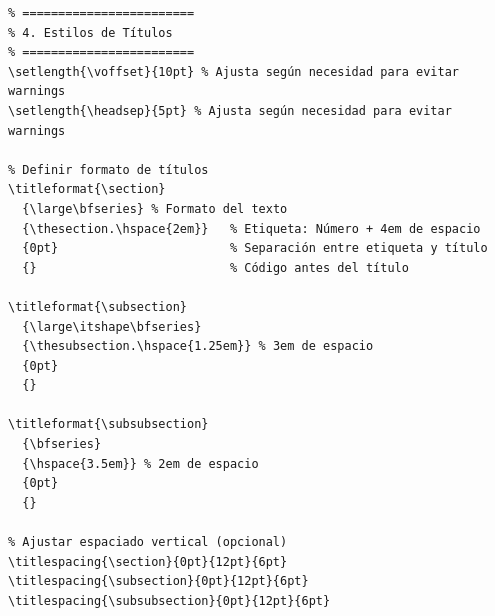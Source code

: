 \documentclass[english]{reporti}
\begin{document}
\begin{verbatim}
% ========================
% 4. Estilos de Títulos
% ========================
\setlength{\voffset}{10pt} % Ajusta según necesidad para evitar warnings
\setlength{\headsep}{5pt} % Ajusta según necesidad para evitar warnings

% Definir formato de títulos
\titleformat{\section}
  {\large\bfseries} % Formato del texto
  {\thesection.\hspace{2em}}   % Etiqueta: Número + 4em de espacio
  {0pt}                        % Separación entre etiqueta y título
  {}                           % Código antes del título

\titleformat{\subsection}
  {\large\itshape\bfseries}
  {\thesubsection.\hspace{1.25em}} % 3em de espacio
  {0pt}
  {}

\titleformat{\subsubsection}
  {\bfseries}
  {\hspace{3.5em}} % 2em de espacio
  {0pt}
  {}

% Ajustar espaciado vertical (opcional)
\titlespacing{\section}{0pt}{12pt}{6pt}
\titlespacing{\subsection}{0pt}{12pt}{6pt}
\titlespacing{\subsubsection}{0pt}{12pt}{6pt}




\end{verbatim}
\end{document}
